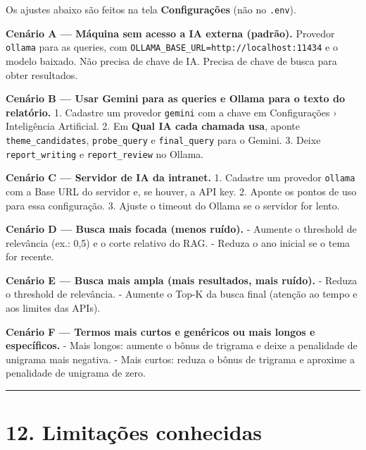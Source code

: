\documentclass[
  brazilian,
  a4paper,12pt,oneside]{report}
\begin{document}
Os ajustes abaixo são feitos na tela \textbf{Configurações} (não no
\texttt{.}\allowbreak{}\texttt{env}).

\textbf{Cenário A --- Máquina sem acesso a IA externa (padrão).}
Provedor \texttt{ollama} para as queries, com
\texttt{OLLAMA\_}\allowbreak{}\texttt{BASE\_}\allowbreak{}\texttt{URL=}\allowbreak{}\texttt{http:}\allowbreak{}\texttt{/}\allowbreak{}\texttt{/}\allowbreak{}\texttt{localhost:}\allowbreak{}\texttt{11434}
e o modelo baixado. Não precisa de chave de IA. Precisa de chave de
busca para obter resultados.

\textbf{Cenário B --- Usar Gemini para as queries e Ollama para o texto
do relatório.} 1. Cadastre um provedor \texttt{gemini} com a chave em
Configurações › Inteligência Artificial. 2. Em \textbf{Qual IA cada
chamada usa}, aponte \texttt{theme\_}\allowbreak{}\texttt{candidates},
\texttt{probe\_}\allowbreak{}\texttt{query} e
\texttt{final\_}\allowbreak{}\texttt{query} para o Gemini. 3. Deixe
\texttt{report\_}\allowbreak{}\texttt{writing} e
\texttt{report\_}\allowbreak{}\texttt{review} no Ollama.

\textbf{Cenário C --- Servidor de IA da intranet.} 1. Cadastre um
provedor \texttt{ollama} com a Base URL do servidor e, se houver, a API
key. 2. Aponte os pontos de uso para essa configuração. 3. Ajuste o
timeout do Ollama se o servidor for lento.

\textbf{Cenário D --- Busca mais focada (menos ruído).} - Aumente o
threshold de relevância (ex.: 0,5) e o corte relativo do RAG. - Reduza o
ano inicial se o tema for recente.

\textbf{Cenário E --- Busca mais ampla (mais resultados, mais ruído).} -
Reduza o threshold de relevância. - Aumente o Top-K da busca final
(atenção ao tempo e aos limites das APIs).

\textbf{Cenário F --- Termos mais curtos e genéricos ou mais longos e
específicos.} - Mais longos: aumente o bônus de trigrama e deixe a
penalidade de unigrama mais negativa. - Mais curtos: reduza o bônus de
trigrama e aproxime a penalidade de unigrama de zero.

\begin{center}\rule{0.5\linewidth}{0.5pt}\end{center}

\chapter{12. Limitações conhecidas}\label{limitauxe7uxf5es-conhecidas}
\end{document}
